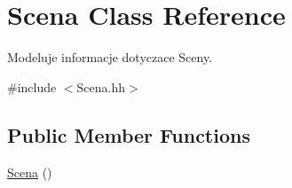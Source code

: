 \hypertarget{class_scena}{\section{Scena Class Reference}
\label{class_scena}
}


Modeluje informacje dotyczace Sceny.  




{\ttfamily \#include $<$Scena.\+hh$>$}

\subsection*{Public Member Functions}
\begin{DoxyCompactItemize}
\item 
\hypertarget{class_scena_a8f9fe11b4cfef890123a2acc94672e17}{\hyperlink{class_scena_a8f9fe11b4cfef890123a2acc94672e17}{Scena} ()}\label{class_scena_a8f9fe11b4cfef890123a2acc94672e17}


\end{DoxyCompactItemize}
